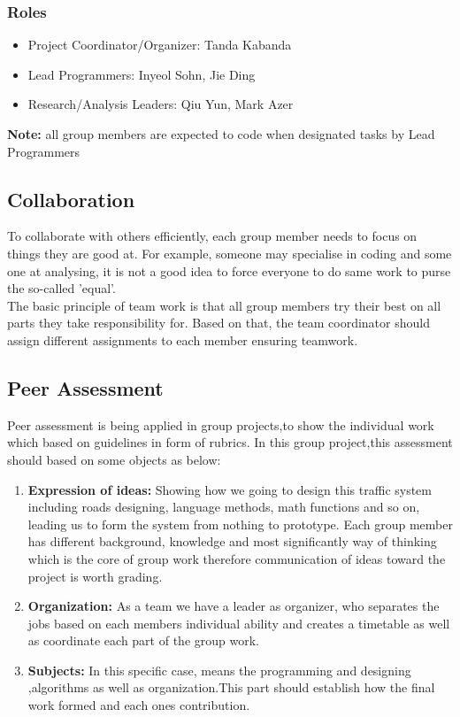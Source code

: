 \documentclass[a4paper,11pt]{article}
\begin{document}
\subsubsection[short]{Roles}

\begin{itemize}%
	\item Project Coordinator/Organizer: Tanda Kabanda
	\item Lead Programmers: Inyeol Sohn, Jie Ding
	\item Research/Analysis Leaders: Qiu Yun, Mark Azer
\end{itemize}

\textbf{Note:} all group members are expected to code when designated tasks by Lead Programmers

\subsection{Collaboration}%
To collaborate with others efficiently, each group member needs to focus on things they are good at. For example, someone may specialise in coding and some one at analysing, it is not a good idea to force everyone to do same work to purse the so-called 'equal'.\\The basic principle of team work is that all group members try their best on all parts they take responsibility for. Based on that, the team coordinator should assign different assignments to each member ensuring teamwork.

\subsection{Peer Assessment}%
Peer assessment is being applied in group projects,to show the individual work which based on guidelines in form of rubrics. In this group project,this assessment should based on some objects as below:

\begin{enumerate}
\item \textbf{Expression of ideas:} Showing how we going to design this traffic system including roads designing, language methods, math functions and so on, leading us to form the system from nothing to prototype. Each group member has different background, knowledge and most significantly way of thinking which is the core of group work therefore communication of ideas toward the project is worth grading.  
\item \textbf{Organization:} As a team we have a leader as organizer, who separates the jobs based on each members individual ability and creates a timetable as well as coordinate each part of the group work.
\item \textbf{Subjects:} In this specific case, means the programming and designing ,algorithms as well as organization.This part should establish how the final work formed and each ones contribution.

\end{enumerate}
\end{document}
